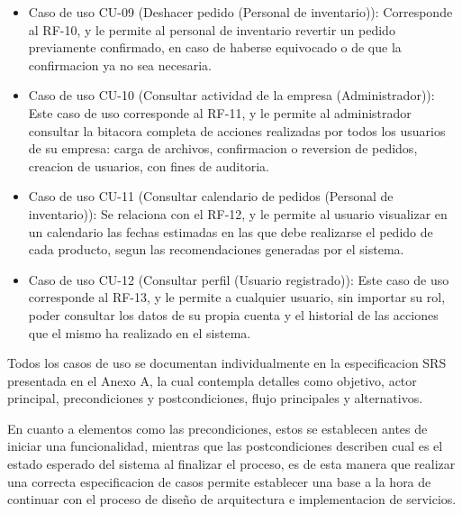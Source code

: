 \begin{itemize}
    \item Caso de uso CU-09 (Deshacer pedido (Personal de inventario)): Corresponde al RF-10, y le permite al personal de inventario revertir un pedido previamente confirmado, en caso de haberse equivocado o de que la confirmacion ya no sea necesaria.

    \item Caso de uso CU-10 (Consultar actividad de la empresa (Administrador)): Este caso de uso corresponde al RF-11, y le permite al administrador consultar la bitacora completa de acciones realizadas por todos los usuarios de su empresa: carga de archivos, confirmacion o reversion de pedidos, creacion de usuarios, con fines de auditoria.

    \item Caso de uso CU-11 (Consultar calendario de pedidos (Personal de inventario)): Se relaciona con el RF-12, y le permite al usuario visualizar en un calendario las fechas estimadas en las que debe realizarse el pedido de cada producto, segun las recomendaciones generadas por el sistema.

    \item Caso de uso CU-12 (Consultar perfil (Usuario registrado)): Este caso de uso corresponde al RF-13, y le permite a cualquier usuario, sin importar su rol, poder consultar los datos de su propia cuenta y el historial de las acciones que el mismo ha realizado en el sistema.
\end{itemize}

Todos los casos de uso se documentan individualmente en la especificacion SRS presentada en el Anexo A, la cual contempla detalles como objetivo, actor principal, precondiciones y postcondiciones, flujo principales y alternativos.

En cuanto a elementos como las precondiciones, estos se establecen antes de iniciar una funcionalidad, mientras que las postcondiciones describen cual es el estado esperado del sistema al finalizar el proceso, es de esta manera que realizar una correcta especificacion de casos permite establecer una base a la hora de continuar con el proceso de diseño de arquitectura e implementacion de servicios.
